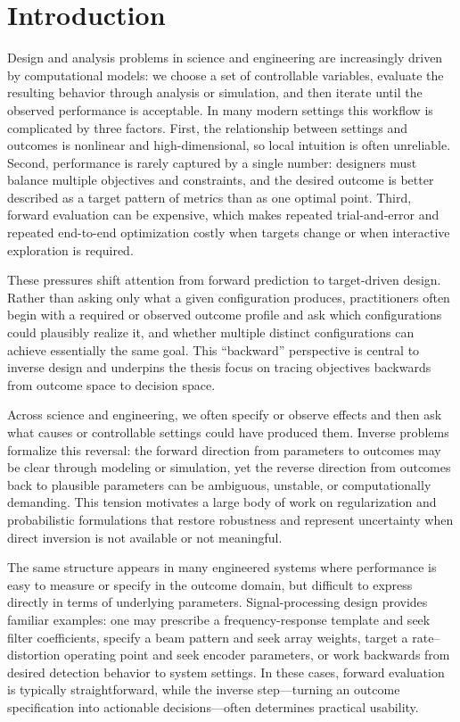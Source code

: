 
\chapter{Introduction}

Design and analysis problems in science and engineering are increasingly driven by computational models: we choose a set of controllable variables, evaluate the resulting behavior through analysis or simulation, and then iterate until the observed performance is acceptable. In many modern settings this workflow is complicated by three factors. First, the relationship between settings and outcomes is nonlinear and high-dimensional, so local intuition is often unreliable. Second, performance is rarely captured by a single number: designers must balance multiple objectives and constraints, and the desired outcome is better described as a target pattern of metrics than as one optimal point. Third, forward evaluation can be expensive, which makes repeated trial-and-error and repeated end-to-end optimization costly when targets change or when interactive exploration is required.

These pressures shift attention from forward prediction to target-driven design. Rather than asking only what a given configuration produces, practitioners often begin with a required or observed outcome profile and ask which configurations could plausibly realize it, and whether multiple distinct configurations can achieve essentially the same goal. This “backward” perspective is central to inverse design and underpins the thesis focus on tracing objectives backwards from outcome space to decision space.

Across science and engineering, we often specify or observe effects and then ask what causes or controllable settings could have produced them. Inverse problems formalize this reversal: the forward direction from parameters to outcomes may be clear through modeling or simulation, yet the reverse direction from outcomes back to plausible parameters can be ambiguous, unstable, or computationally demanding. This tension motivates a large body of work on regularization and probabilistic formulations that restore robustness and represent uncertainty when direct inversion is not available or not meaningful.


The same structure appears in many engineered systems where performance is easy to measure or specify in the outcome domain, but difficult to express directly in terms of underlying parameters. Signal-processing design provides familiar examples: one may prescribe a frequency-response template and seek filter coefficients, specify a beam pattern and seek array weights, target a rate--distortion operating point and seek encoder parameters, or work backwards from desired detection behavior to system settings. In these cases, forward evaluation is typically straightforward, while the inverse step---turning an outcome specification into actionable decisions---often determines practical usability.

